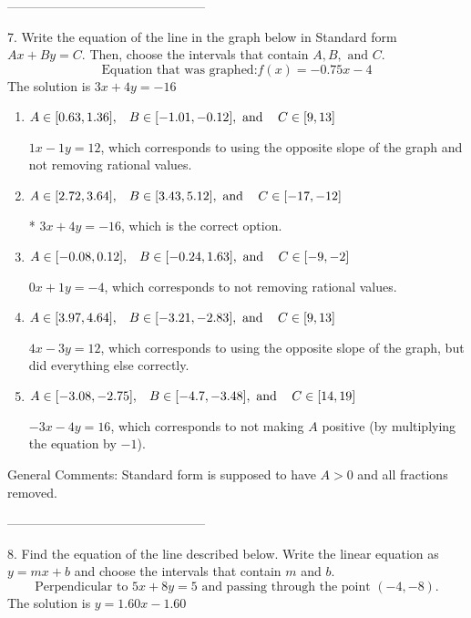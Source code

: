 \documentclass{article}[14pt]
\begin{document}
-----------------------------------------------

7. Write the equation of the line in the graph below in Standard form $Ax+By=C$. Then, choose the intervals that contain $A, B, \text{ and } C$.
$$ \text{Equation that was graphed:} f(x)= -0.75 x - 4 $$ 
The solution is $ 3 x + 4 y = -16 $ 

\begin{enumerate}[label=\Alph*.] 
\item $ A \in [0.63, 1.36], \hspace{3mm} B \in [-1.01, -0.12], \text{ and } \hspace{3mm} C \in [9, 13] $ 

  $1x - 1y = 12$, which corresponds to using the opposite slope of the graph and not removing rational values. 
\item $ A \in [2.72, 3.64], \hspace{3mm} B \in [3.43, 5.12], \text{ and } \hspace{3mm} C \in [-17, -12] $ 

 * $3x + 4y = -16$, which is the correct option. 
\item $ A \in [-0.08, 0.12], \hspace{3mm} B \in [-0.24, 1.63], \text{ and } \hspace{3mm} C \in [-9, -2] $ 

  $0x + 1y = -4$, which corresponds to not removing rational values. 
\item $ A \in [3.97, 4.64], \hspace{3mm} B \in [-3.21, -2.83], \text{ and } \hspace{3mm} C \in [9, 13] $ 

  $4x - 3y = 12$, which corresponds to using the opposite slope of the graph, but did everything else correctly. 
\item $ A \in [-3.08, -2.75], \hspace{3mm} B \in [-4.7, -3.48], \text{ and } \hspace{3mm} C \in [14, 19] $ 

  $-3x - 4y = 16$, which corresponds to not making $A$ positive (by multiplying the equation by $-1$). 
\end{enumerate} 
 
General Comments: Standard form is supposed to have $A > 0$ and all fractions removed.

-----------------------------------------------

8. Find the equation of the line described below. Write the linear equation as $ y=mx+b $ and choose the intervals that contain $m$ and $b$.
$$ \text{Perpendicular to } 5 x + 8 y = 5 \text{ and passing through the point } (-4, -8). $$ 
The solution is $ y = 1.60x - 1.60 $ 
\end{document}

